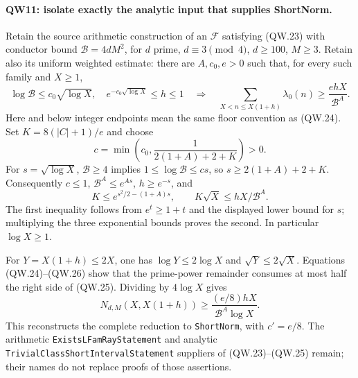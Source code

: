 \paragraph{QW11: isolate exactly the analytic input that supplies ShortNorm.}
Retain the source arithmetic construction of an $\mathcal F$ satisfying
(QW.23) with conductor bound $\mathcal B=4dM^2$, for
$d$ prime, $d\equiv3\pmod4$, $d\ge100$, $M\ge3$.
Retain also its uniform weighted estimate: there are $A,c_0,e>0$ such
that, for every such family and $X\ge1$,
\[
 \log\mathcal B\le c_0\sqrt{\log X},\quad
 e^{-c_0\sqrt{\log X}}\le h\le1
 \quad\Longrightarrow\quad
 \sum_{X<n\le X(1+h)}\lambda_0(n)\ge\frac{e hX}{\mathcal B^A}.
                                                                    \tag{QW.25}
\]
Here and below integer endpoints mean the same floor convention as
(QW.24). Set $K=8(|C|+1)/e$ and choose
\[
 c=\min\left(c_0,\frac1{2(1+A)+2+K}\right)>0.
\]
For $s=\sqrt{\log X}$, $\mathcal B\ge4$ implies
$1\le\log\mathcal B\le cs$, so $s\ge2(1+A)+2+K$.
Consequently $c\le1$, $\mathcal B^A\le e^{As}$,
$h\ge e^{-s}$, and
\[
 K\le e^{s^2/2-(1+A)s},\qquad
                       K\sqrt X\le hX/\mathcal B^A.           \tag{QW.26}
\]
The first inequality follows from $e^t\ge1+t$ and the displayed
lower bound for $s$; multiplying the three exponential bounds proves
the second. In particular $\log X\ge1$.

For $Y=X(1+h)\le2X$, one has
$\log Y\le2\log X$ and $\sqrt Y\le2\sqrt X$.
Equations (QW.24)--(QW.26) show that the prime-power remainder consumes
at most half the right side of (QW.25). Dividing by $4\log X$ gives
\[
       N_{d,M}(X,X(1+h))\ge
          \frac{(e/8)hX}{\mathcal B^A\log X}.                  \tag{QW.27}
\]
This reconstructs the complete reduction to \texttt{ShortNorm}, with
$c'=e/8$. The arithmetic \texttt{ExistsLFamRayStatement} and analytic
\texttt{TrivialClassShortIntervalStatement} suppliers of (QW.23)--(QW.25)
remain; their names do not replace proofs of those assertions.

